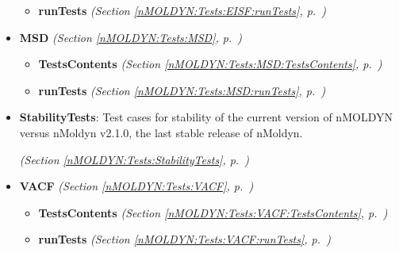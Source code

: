 \begin{itemize}
\begin{itemize}
    \item \textbf{runTests}
  \textit{(Section \ref{nMOLDYN:Tests:EISF:runTests}, p.~\pageref{nMOLDYN:Tests:EISF:runTests})}

  \end{itemize}
\item \textbf{MSD}
  \textit{(Section \ref{nMOLDYN:Tests:MSD}, p.~\pageref{nMOLDYN:Tests:MSD})}

  \begin{itemize}
\setlength{\parskip}{0ex}
    \item \textbf{TestsContents}
  \textit{(Section \ref{nMOLDYN:Tests:MSD:TestsContents}, p.~\pageref{nMOLDYN:Tests:MSD:TestsContents})}

    \item \textbf{runTests}
  \textit{(Section \ref{nMOLDYN:Tests:MSD:runTests}, p.~\pageref{nMOLDYN:Tests:MSD:runTests})}

  \end{itemize}
\item \textbf{StabilityTests}: 
Test cases for stability of the current version of nMOLDYN versus nMoldyn v2.1.0, the last stable release 
of nMoldyn.



  \textit{(Section \ref{nMOLDYN:Tests:StabilityTests}, p.~\pageref{nMOLDYN:Tests:StabilityTests})}

\item \textbf{VACF}
  \textit{(Section \ref{nMOLDYN:Tests:VACF}, p.~\pageref{nMOLDYN:Tests:VACF})}

  \begin{itemize}
\setlength{\parskip}{0ex}
    \item \textbf{TestsContents}
  \textit{(Section \ref{nMOLDYN:Tests:VACF:TestsContents}, p.~\pageref{nMOLDYN:Tests:VACF:TestsContents})}

    \item \textbf{runTests}
  \textit{(Section \ref{nMOLDYN:Tests:VACF:runTests}, p.~\pageref{nMOLDYN:Tests:VACF:runTests})}

  \end{itemize}
\end{itemize}


